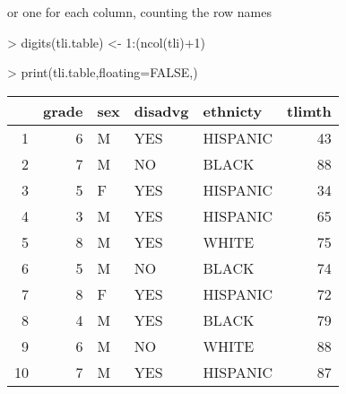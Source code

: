 \documentclass[letterpaper]{article}
\begin{document}
or one for each column, counting the row names
\begin{Schunk}
\begin{Sinput}
> digits(tli.table) <- 1:(ncol(tli)+1)
\end{Sinput}
\end{Schunk}
\begin{Schunk}
\begin{Sinput}
> print(tli.table,floating=FALSE,)
\end{Sinput}
% latex table generated in R 3.1.1 by xtable 1.7-3 package
% 
\begin{tabular}{|rr|lp{3cm}l|r|}
  \hline
 & grade & sex & disadvg & ethnicty & tlimth \\ 
  \hline
1 &   6 & M & YES & HISPANIC &      43 \\ 
  2 &   7 & M & NO & BLACK &      88 \\ 
  3 &   5 & F & YES & HISPANIC &      34 \\ 
  4 &   3 & M & YES & HISPANIC &      65 \\ 
  5 &   8 & M & YES & WHITE &      75 \\ 
  6 &   5 & M & NO & BLACK &      74 \\ 
  7 &   8 & F & YES & HISPANIC &      72 \\ 
  8 &   4 & M & YES & BLACK &      79 \\ 
  9 &   6 & M & NO & WHITE &      88 \\ 
  10 &   7 & M & YES & HISPANIC &      87 \\ 
   \hline
\end{tabular}\end{Schunk}
\end{document}
